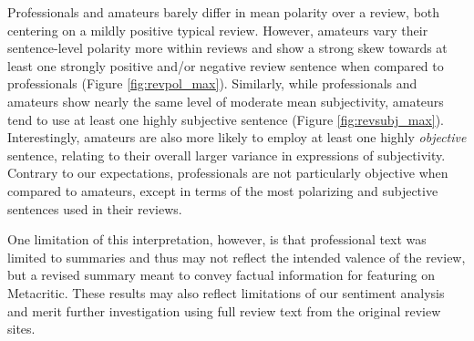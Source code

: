 \documentclass[letterpaper]{article}
\begin{document}
Professionals and amateurs barely differ in mean polarity over a review, both centering on a mildly positive typical review. However, amateurs vary their sentence-level polarity more within reviews and show a strong skew towards at least one strongly positive and/or negative review sentence when compared to professionals (Figure \ref{fig:revpol_max}). Similarly, while professionals and amateurs show nearly the same level of moderate mean subjectivity, amateurs tend to use at least one highly subjective sentence (Figure \ref{fig:revsubj_max}). Interestingly, amateurs are also more likely to employ at least one highly \textit{objective} sentence, relating to their overall larger variance in expressions of subjectivity. Contrary to our expectations, professionals are not particularly objective when compared to amateurs, except in terms of the most polarizing and subjective sentences used in their reviews.

One limitation of this interpretation, however, is that professional
text was limited to summaries and thus may not reflect the intended valence of the review, but a revised summary meant to convey factual information for featuring on Metacritic. These results may also reflect limitations of our sentiment analysis and merit further investigation using full review text from the original review sites.
\end{document}
